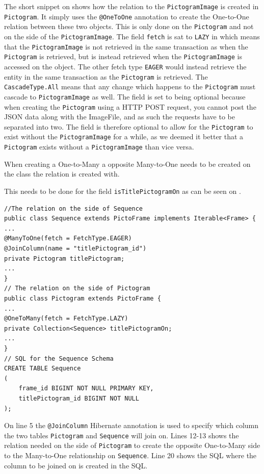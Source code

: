 The short snippet on  shows how the relation to the \texttt{PictogramImage} is created in \texttt{Pictogram}.
It simply uses the \texttt{@OneToOne} annotation to create the One-to-One relation between these two objects.
This is only done on the \texttt{Pictogram} and not on the side of the \texttt{PictogramImage}.
The field \texttt{fetch} is sat to \texttt{LAZY} in which means that the \texttt{PictogramImage} is not retrieved in the same transaction as when the \texttt{Pictogram} is retrieved, but is instead retrieved when the \texttt{PictogramImage} is accessed on the object.
The other fetch type \texttt{EAGER} would instead retrieve the entity in the same transaction as the \texttt{Pictogram} is retrieved.
The \texttt{CascadeType.All} means that any change which happens to the \texttt{Pictogram} must cascade to \texttt{PictogramImage} as well.
The field is set to being optional because when creating the \texttt{Pictogram} using a HTTP POST request, you cannot post the JSON data along with the ImageFile, and as such the requests have to be separated into two.
The field is therefore optional to allow for the \texttt{Pictogram} to exist without the \texttt{PictogramImage} for a while, as we deemed it better that a \texttt{Pictogram} exists without a \texttt{PictogramImage} than vice versa.

When creating a One-to-Many a opposite Many-to-One needs to be created on the class the relation is created with.

This needs to be done for the field \texttt{isTitlePictogramOn} as can be seen on .

\begin{lstlisting}[float, floatplacement=h, caption={Fields with annotations which causes Hibernate to perform the ORM for \texttt{titlePictogram}.},label={lst:titlePictogram}]
//The relation on the side of Sequence
public class Sequence extends PictoFrame implements Iterable<Frame> {
...
@ManyToOne(fetch = FetchType.EAGER)
@JoinColumn(name = "titlePictogram_id")
private Pictogram titlePictogram;
...
}
// The relation on the side of Pictogram
public class Pictogram extends PictoFrame {
...
@OneToMany(fetch = FetchType.LAZY)
private Collection<Sequence> titlePictogramOn;
...
}
// SQL for the Sequence Schema
CREATE TABLE Sequence
(
    frame_id BIGINT NOT NULL PRIMARY KEY,
    titlePictogram_id BIGINT NOT NULL
);
\end{lstlisting}

On line 5 the \texttt{@JoinColumn} Hibernate annotation is used to specify which column the two tables \texttt{Pictogram} and \texttt{Sequence} will join on.
Lines 12-13 shows the relation needed on the side of \texttt{Pictogram} to create the opposite One-to-Many side to the Many-to-One relationship on \texttt{Sequence}.
Line 20 shows the SQL where the column to be joined on is created in the SQL.

